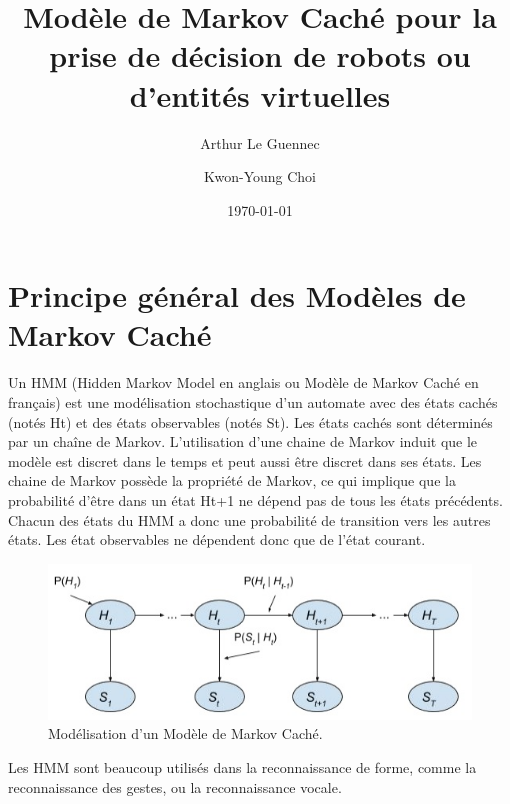 \documentclass[11pt]{article}
\title{Modèle de Markov Caché pour la prise de décision de robots ou d'entités virtuelles}
\author{Arthur Le Guennec \and Kwon-Young Choi}
\date{\normalsize\today}
\begin{document}
\maketitle

\section{Principe général des Modèles de Markov Caché}

Un HMM (Hidden Markov Model en anglais ou Modèle de Markov Caché en français) est une modélisation stochastique d’un automate avec des états cachés (notés Ht) et des états observables (notés St).
Les états cachés sont déterminés par un chaîne de Markov.
L'utilisation d'une chaine de Markov induit que le modèle est discret dans le temps et peut aussi être discret dans ses états.
Les chaine de Markov possède la propriété de Markov, ce qui implique que la probabilité d'être dans un état Ht+1 ne dépend pas de tous les états précédents.
Chacun des états du HMM a donc une probabilité de transition vers les autres états.
Les état observables ne dépendent donc que de l'état courant.

\begin{figure}[btp]
  \centering
  \includegraphics[scale=1]{hmm}
  \caption{\label{hmm} Modélisation d'un Modèle de Markov Caché.}
\end{figure}

Les HMM sont beaucoup utilisés dans  la reconnaissance de forme, comme la reconnaissance des gestes, ou la reconnaissance vocale.
\end{document}

